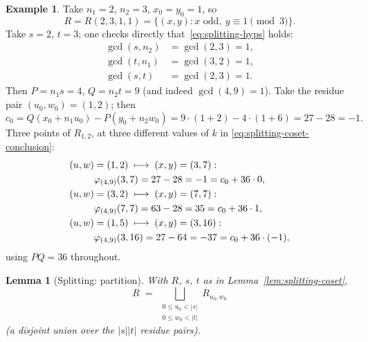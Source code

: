 \documentclass[a4paper,11pt,oneside,reqno]{amsart}
\theoremstyle{definition}
\newtheorem{example}[definition]{Example}
\theoremstyle{remark}
\theoremstyle{plain}
\newtheorem{lemma}[definition]{Lemma}
\begin{document}
\begin{example}
  \label{ex:splitting-worked}
  Take \(n_1=2\), \(n_2=3\), \(x_0=y_0=1\), so
  \[
    R=R(2,3,1,1)=\{(x,y):x\text{ odd},\ y\equiv1\!\!\pmod3\}.
  \]
  Take \(s=2\), \(t=3\); one checks directly that~\eqref{eq:splitting-hyps} holds:
  \begin{align}
    \gcd(s,n_2) &= \gcd(2,3) = 1, \\
    \gcd(t,n_1) &= \gcd(3,2) = 1, \\
    \gcd(s,t) &= \gcd(2,3) = 1.
  \end{align}
  Then \(P=n_1s=4\), \(Q=n_2t=9\) (and indeed \(\gcd(4,9)=1\)). Take the residue pair \((u_0,w_0)=(1,2)\);
  then
  \begin{equation}
    c_0 = Q(x_0+n_1u_0)-P(y_0+n_2w_0) = 9\cdot(1+2)-4\cdot(1+6) = 27-28 = -1.
  \end{equation}
  Three points of \(R_{1,2}\), at three different values of \(k\) in
  \eqref{eq:splitting-coset-conclusion}:
  \begin{align}
    (u,w)&=(1,2) \;\longmapsto\; (x,y)=(3,7): \notag\\
    &\varphi_{(4,9)}(3,7)=27-28=-1=c_0+36\cdot0, \\
    (u,w)&=(3,2) \;\longmapsto\; (x,y)=(7,7): \notag\\
    &\varphi_{(4,9)}(7,7)=63-28=35=c_0+36\cdot1, \\
    (u,w)&=(1,5) \;\longmapsto\; (x,y)=(3,16): \notag\\
    &\varphi_{(4,9)}(3,16)=27-64=-37=c_0+36\cdot(-1),
  \end{align}
  using \(PQ=36\) throughout.
\end{example}

\begin{lemma}[Splitting: partition]
  \label{lem:splitting-partition}
  With \(R\), \(s\), \(t\) as in Lemma~\ref{lem:splitting-coset},
  \begin{equation}
    \label{eq:splitting-partition-conclusion}
    R \;=\; \bigsqcup_{\substack{0\le u_0<|s| \\ 0\le w_0<|t|}} R_{u_0,w_0}
  \end{equation}
  (a disjoint union over the \(|s||t|\) residue pairs).
\end{lemma}
\end{document}
